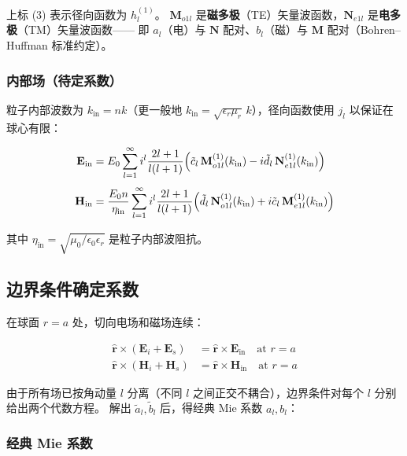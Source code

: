 上标 (3) 表示径向函数为 $h_l^{(1)}$。
$\mathbf{M}_{o1l}$ 是\textbf{磁多极}（TE）矢量波函数，$\mathbf{N}_{e1l}$ 是\textbf{电多极}（TM）矢量波函数——
即 $a_l$（电）与 $\mathbf{N}$ 配对、$b_l$（磁）与 $\mathbf{M}$ 配对（Bohren--Huffman 标准约定）。

\subsubsection{内部场（待定系数）}

粒子内部波数为 $k_{\text{in}} = n k$（更一般地 $k_{\text{in}} = \sqrt{\epsilon_r\mu_r}\,k$），径向函数使用 $j_l$ 以保证在球心有限：

\begin{align}
  \mathbf{E}_{\text{in}} &= E_0\sum_{l=1}^\infty i^l\frac{2l+1}{l(l+1)}\Bigl(
    \tilde{c}_l\,\mathbf{M}_{o1l}^{(1)}(k_{\text{in}}) - i\tilde{d}_l\,\mathbf{N}_{e1l}^{(1)}(k_{\text{in}})\Bigr) \label{eq:mie_Ein}\\[0.3em]
  \mathbf{H}_{\text{in}} &= \frac{E_0 n}{\eta_{\text{in}}}\sum_{l=1}^\infty i^l\frac{2l+1}{l(l+1)}\Bigl(
    \tilde{d}_l\,\mathbf{N}_{o1l}^{(1)}(k_{\text{in}}) + i\tilde{c}_l\,\mathbf{M}_{e1l}^{(1)}(k_{\text{in}})\Bigr) \label{eq:mie_Hin}
\end{align}

其中 $\eta_{\text{in}} = \sqrt{\mu_0/\epsilon_0\epsilon_r}$ 是粒子内部波阻抗。

\subsection{边界条件确定系数}

在球面 $r=a$ 处，切向电场和磁场连续：

\begin{align}
  \hat{\mathbf{r}}\times(\mathbf{E}_i + \mathbf{E}_s) &= \hat{\mathbf{r}}\times\mathbf{E}_{\text{in}} \quad\text{at } r=a \\
  \hat{\mathbf{r}}\times(\mathbf{H}_i + \mathbf{H}_s) &= \hat{\mathbf{r}}\times\mathbf{H}_{\text{in}} \quad\text{at } r=a
\end{align}

由于所有场已按角动量 $l$ 分离（不同 $l$ 之间正交不耦合），边界条件对每个 $l$ 分别给出两个代数方程。
解出 $\tilde{a}_l,\tilde{b}_l$ 后，得经典 Mie 系数 $a_l,b_l$：

\subsubsection{经典 Mie 系数}

